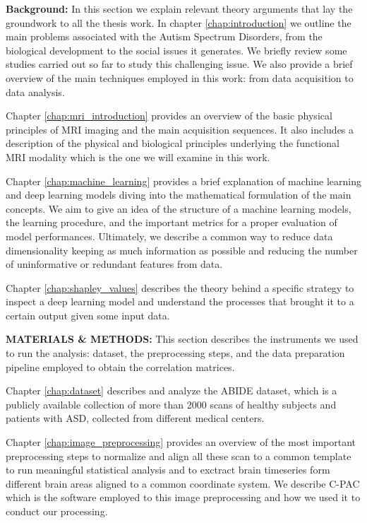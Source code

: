 \documentclass[11pt]{report}
\begin{document}
\textbf{Background:} In this section we explain relevant theory arguments that lay the groundwork to all the thesis work.
In chapter \ref{chap:introduction} we outline the main problems associated with the Autism Spectrum Disorders, from the biological development to the social issues it generates. We briefly review some studies carried out so far to study this challenging issue. We also provide a brief overview of the main techniques employed in this work: from data acquisition to data analysis.

Chapter \ref{chap:mri_introduction} provides an overview of the basic physical principles of MRI imaging and the main acquisition sequences. It also includes a description of the physical and biological principles underlying the functional MRI modality which is the one we will examine in this work.

Chapter \ref{chap:machine_learning} provides a brief explanation of machine learning and deep learning models diving into the mathematical formulation of the main concepts. We aim to give an idea of the structure of a machine learning models, the learning procedure, and the important metrics for a proper evaluation of model performances.
Ultimately, we describe a common way to reduce data dimensionality keeping as much information as possible and reducing the number of uninformative or redundant features from data.

Chapter \ref{chap:shapley_values} describes the theory behind a specific strategy to inspect a deep learning model and understand the processes that brought it to a certain output given some input data.

\textbf{MATERIALS \& METHODS:} This section describes the instruments we used to run the analysis: dataset, the preprocessing steps, and the data preparation pipeline employed to obtain the correlation matrices.

Chapter \ref{chap:dataset} describes and analyze the ABIDE dataset, which is a publicly available collection of more than 2000 scans of healthy subjects and patients with ASD, collected from different medical centers.

Chapter \ref{chap:image_preprocessing} provides an overview of the most important preprocessing steps to normalize and align all these scan to a common template to run meaningful statistical analysis and to exctract brain timeseries form different brain areas aligned to a common coordinate system. We describe C-PAC which is the software employed to this image preprocessing and how we used it to conduct our processing.
\end{document}
